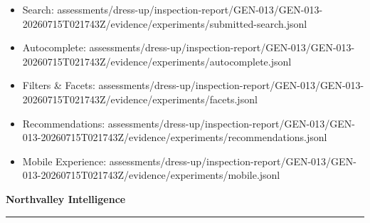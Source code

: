 \documentclass[10pt]{article}
\newcommand{\ReportFine}[1]{{\fontsize{7.6}{9.1}\selectfont\color{NVIMuted}#1}}
\begin{document}
\begin{itemize}
\item \ReportFine{Search: assessments/dress-up/inspection-report/GEN-013/GEN-013-20260715T021743Z/evidence/experiments/submitted-search.jsonl}
\item \ReportFine{Autocomplete: assessments/dress-up/inspection-report/GEN-013/GEN-013-20260715T021743Z/evidence/experiments/autocomplete.jsonl}
\item \ReportFine{Filters \& Facets: assessments/dress-up/inspection-report/GEN-013/GEN-013-20260715T021743Z/evidence/experiments/facets.jsonl}
\item \ReportFine{Recommendations: assessments/dress-up/inspection-report/GEN-013/GEN-013-20260715T021743Z/evidence/experiments/recommendations.jsonl}
\item \ReportFine{Mobile Experience: assessments/dress-up/inspection-report/GEN-013/GEN-013-20260715T021743Z/evidence/experiments/mobile.jsonl}
\end{itemize}
\vfill
\begin{center}
{\fontsize{16}{19}\selectfont\bfseries\color{NVIInk}Northvalley Intelligence}\\[0.06in]
{\color{NVIAccent}\rule{2.2in}{0.8pt}}\\[0.08in]
\ReportFine{\NorthvalleyContactLine}
\end{center}
\end{document}
